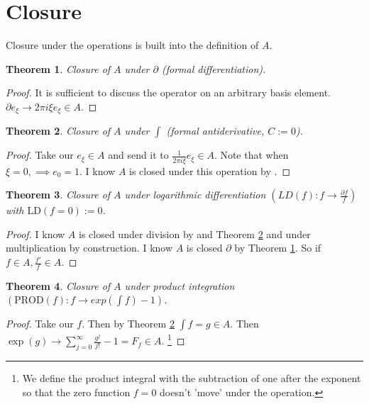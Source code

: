 \documentclass{artjlt}
\newtheorem{thm}{Theorem}
\newcommand{\?}{\textbackslash}
\begin{document}
\section{Closure}
   Closure under the operations is built into the definition of $A$.
   \begin{thm} \label{thm:1}
      Closure of $A$ under $\partial$ (formal differentiation).
   \end{thm}
   \begin{proof}
      It is sufficient to discuss the operator on an arbitrary basis element. $\partial e_\xi \to 2 \pi i \xi e_{\xi} \in A$.
   \end{proof}
   \begin{thm} \label{thm:2}
      Closure of $A$ under $\int$ (formal antiderivative, $C:=0$). 
   \end{thm}
   \begin{proof}
      Take our $e_\xi \in A$ and send it to $\frac{1}{2 \pi i \xi} e_{\xi} \in A$. Note that when $\xi = 0, \implies e_0 = 1$. I know $A$ is closed under this operation by \cite{Hormander1958}. 
   \end{proof}
   \begin{thm}
      Closure of $A$ under logarithmic differentiation $(LD(f): f \to \frac{\partial f}{f})$ with $\text{LD}(f=0) := 0$.
   \end{thm}
   \begin{proof}
      I know $A$ is closed under division by \cite{Hormander1958} and Theorem \ref{thm:2} and under multiplication by construction. I know $A$ is closed $\partial$ by Theorem \ref{thm:1}. So if $f \in A, \frac{f'}{f} \in A$.
   \end{proof}
   \begin{thm} \label{thm:4}
      Closure of $A$ under product integration $(\text{PROD}(f) : f \to exp(\int f) - 1)$.
   \end{thm}
   \begin{proof}
      Take our $f$. Then by Theorem \ref{thm:2} $\int f = g \in A$. Then $\exp(g) \to \sum_{j=0}^{\infty} \frac{g^j}{j!} - 1 = F_f \in A$. \footnote{We define the product integral with the subtraction of one after the exponent so that the zero function $f=0$ doesn't 'move' under the operation.} 
\end{proof}
\end{document}
